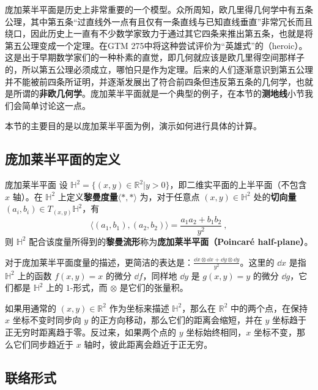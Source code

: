 
庞加莱半平面是历史上非常重要的一个模型。众所周知，欧几里得几何学中有五条公理，其中第五条“过直线外一点有且仅有一条直线与已知直线垂直”非常冗长而且绕口，因此历史上一直有不少数学家致力于通过其它四条来推出第五条，也就是将第五公理变成一个定理。在GTM 275\cite{GTM275}中将这种尝试评价为“英雄式”的（heroic）。这是出于早期数学家们的一种朴素的直觉，即几何就应该是欧几里得空间那样子的，所以第五公理必须成立，哪怕只是作为定理。后来的人们逐渐意识到第五公理并不能被前四条所证明，并逐渐发展出了符合前四条但违反第五条的几何学，也就是所谓的\textbf{非欧几何学}。庞加莱半平面就是一个典型的例子，在本节的\textbf{测地线}小节我们会简单讨论这一点。

本节的主要目的是以庞加莱半平面为例，演示如何进行具体的计算。

\subsection{庞加莱半平面的定义}

\begin{definition}{庞加莱半平面}
设 $\mathbb{H}^2=\{(x, y)\in \mathbb{R}^2|y>0\}$，即二维实平面的上半平面（不包含 $x$ 轴）。在 $\mathbb{H}^2$ 上定义\textbf{黎曼度量}$\langle*,*\rangle$ 为，对于任意点 $(x, y)\in \mathbb{H}^2$ 处的\textbf{切向量}$(a_i, b_i)\in T_{(x, y)}\mathbb{H}^2$，有
\begin{equation}
\langle(a_1, b_1), (a_2, b_2)\rangle=\frac{a_1a_2+b_1b_2}{y^2}~,
\end{equation}
则 $\mathbb{H}^2$ 配合该度量所得到的\textbf{黎曼流形}称为\textbf{庞加莱半平面（Poincaré half-plane）}。
\end{definition}

对于庞加莱半平面度量的描述，更简洁的表达是：$\frac{\dd x\otimes \dd x+ \dd y\otimes\dd y}{y^2}$。这里的 $\dd x$ 是指 $\mathbb{H}^2$ 上的函数 $f(x, y)=x$ 的微分 $\dd f$，同样地 $\dd y$ 是 $g(x, y)=y$ 的微分 $\dd g$，它们都是 $\mathbb{H}^2$ 上的 $1$-形式，而 $\otimes$ 是它们的张量积。

如果用通常的 $(x, y)\in \mathbb{R}^2$ 作为坐标来描述 $\mathbb{H}^2$，那么在 $\mathbb{R}^2$ 中的两个点，在保持 $x$ 坐标不变时同步向 $y$ 的正方向移动，那么它们的距离会缩短，并在 $y$ 坐标趋于正无穷时距离趋于零。反过来，如果两个点的 $y$ 坐标始终相同，$x$ 坐标不变，那么它们同步趋近于 $x$ 轴时，彼此距离会趋近于正无穷。

\subsection{联络形式}


